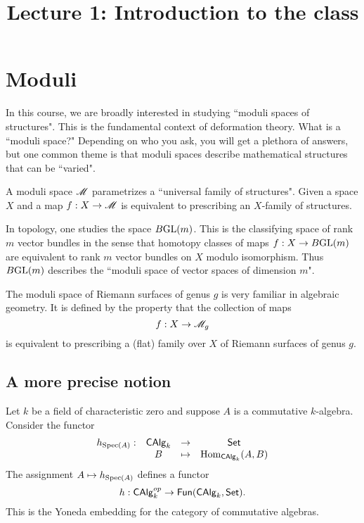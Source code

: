 \documentclass[11pt]{amsart}
\title{Lecture 1: Introduction to the class}
\begin{document}
\maketitle

\section{Moduli}

In this course, we are broadly interested in studying ``moduli spaces of structures".
This is the fundamental context of deformation theory. 
What is a ``moduli space?"
Depending on who you ask, you will get a plethora of answers, but one common theme is that moduli spaces describe mathematical structures that can be ``varied". 

\begin{evdfn}
A moduli space $\mathscr M$ parametrizes a ``universal family of structures". 
Given a space $X$ and a map $f : X \to \mathscr M$ is equivalent to prescribing an $X$-family of structures. 
\end{evdfn} 

\begin{eg}
In topology, one studies the space $B {\rm GL}(m)$. 
This is the classifying space of rank $m$ vector bundles in the sense that homotopy classes of maps $f : X \to B {\rm GL}(m)$ are equivalent to rank $m$ vector bundles on $X$ modulo isomorphism. 
Thus $B {\rm GL}(m)$ describes the ``moduli space of vector spaces of dimension $m$". 
\end{eg}

\begin{eg}
The moduli space of Riemann surfaces of genus $g$ is very familiar in algebraic geometry. 
It is defined by the property that the collection of maps 
\[
f : X \to \mathscr M_g
\]
is equivalent to prescribing a (flat) family over $X$ of Riemann surfaces of genus $g$. 
\end{eg}

\subsection{A more precise notion}

Let $k$ be a field of characteristic zero and suppose $A$ is a commutative $k$-algebra.
Consider the functor
\[
\begin{array}{cccc}
h_{{\rm Spec}(A)} : & {\sf CAlg}_k & \to & {\sf Set} \\
& B & \mapsto & {\rm Hom}_{{\sf CAlg}_k}(A,B) 
\end{array}
\]
The assignment $A \mapsto h_{{\rm Spec}(A)}$ defines a functor
\[
h : {\sf CAlg}^{op}_k \to {\sf Fun}({\sf CAlg}_k , {\sf Set}) .
\]
This is the Yoneda embedding for the category of commutative algebras. 
\end{document}
